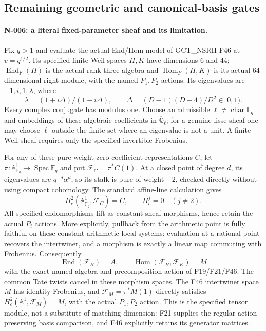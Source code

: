 \subsection{Remaining geometric and canonical-basis gates}

\paragraph{N-006: a literal fixed-parameter sheaf and its limitation.}
Fix $q>1$ and evaluate the actual End/Hom model of GCT\_NSRH F46 at
$v=q^{1/2}$.  Its specified finite Weil spaces $H,K$ have dimensions
6 and 44; $\operatorname{End}_F(H)$ is the actual rank-three algebra
and $\operatorname{Hom}_F(H,K)$ is its actual 64-dimensional right
module, with the named $P_1,P_2$ actions.  Its eigenvalues are
$-1,i,1,\lambda$, where
\[
 \lambda=(1+i\Delta)/(1-i\Delta),\qquad
 \Delta=(D-1)(D-4)/D^2\in[0,1).
\]
Every complex conjugate has modulus one.  Choose an admissible
$\ell\ne\operatorname{char}\mathbb F_q$ and embeddings of these
algebraic coefficients in $\overline{\mathbb Q}_\ell$; for a genuine
lisse sheaf one may choose $\ell$ outside the finite set where an
eigenvalue is not a unit.  A finite Weil sheaf requires only the
specified invertible Frobenius.

For any of these pure weight-zero coefficient representations $C$,
let $\pi:\mathbb A^1_{\mathbb F_q}\to\operatorname{Spec}\mathbb F_q$
and put $\mathscr F_C=\pi^*C(1)$.  At a closed point of degree $d$,
its eigenvalues are $q^{-d}\alpha^d$, so its stalk is pure of weight
$-2$, checked directly without using compact cohomology.
The standard affine-line calculation gives
\[
 H_c^2(\mathbb A^1_{\overline{\mathbb F}_q},\mathscr F_C)=C,
 \qquad H_c^j=0\quad(j\ne2).
\]
All specified endomorphisms lift as constant sheaf morphisms, hence
retain the actual $P_i$ actions.  More explicitly, pullback from the
arithmetic point is fully faithful on these constant arithmetic local
systems: evaluation at a rational point recovers the intertwiner,
and a morphism is exactly a linear map commuting with Frobenius.
Consequently
\[
 \operatorname{End}(\mathscr F_H)=A,\qquad
 \operatorname{Hom}(\mathscr F_H,\mathscr F_K)=M
\]
with the exact named algebra and precomposition action of F19/F21/F46.
The common Tate twists cancel in these morphism spaces.
The F46 intertwiner space $M$ has identity Frobenius, and
$\mathscr F_M=\pi^*M(1)$ directly satisfies
$H_c^2(\mathbb A^1,\mathscr F_M)=M$, with the actual $P_1,P_2$
action.  This is the specified tensor module, not a substitute of
matching dimension: F21 supplies the regular action-preserving
basis comparison, and F46 explicitly retains its generator matrices.

